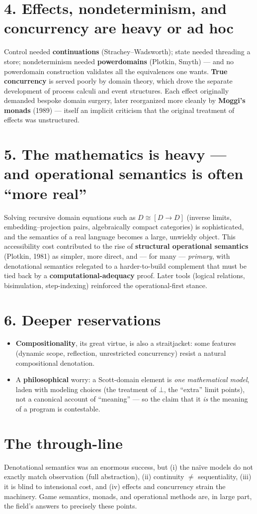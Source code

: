 \documentclass[11pt]{article}
\begin{document}
\section*{4. Effects, nondeterminism, and concurrency are heavy or ad hoc}
Control needed \textbf{continuations} (Strachey--Wadsworth); state needed
threading a store; nondeterminism needed \textbf{powerdomains} (Plotkin, Smyth)
--- and no powerdomain construction validates all the equivalences one wants.
\textbf{True concurrency} is served poorly by domain theory, which drove the
separate development of process calculi and event structures. Each effect
originally demanded bespoke domain surgery, later reorganized more cleanly by
\textbf{Moggi's monads} (1989) --- itself an implicit criticism that the original
treatment of effects was unstructured.

\section*{5. The mathematics is heavy --- and operational semantics is often ``more real''}
Solving recursive domain equations such as $D \cong [D \to D]$ (inverse limits,
embedding--projection pairs, algebraically compact categories) is sophisticated,
and the semantics of a real language becomes a large, unwieldy object. This
accessibility cost contributed to the rise of \textbf{structural operational
semantics} (Plotkin, 1981) as simpler, more direct, and --- for many ---
\emph{primary}, with denotational semantics relegated to a harder-to-build
complement that must be tied back by a \textbf{computational-adequacy} proof.
Later tools (logical relations, bisimulation, step-indexing) reinforced the
operational-first stance.

\section*{6. Deeper reservations}
\begin{itemize}
  \item \textbf{Compositionality}, its great virtue, is also a straitjacket: some
    features (dynamic scope, reflection, unrestricted concurrency) resist a
    natural compositional denotation.
  \item A \textbf{philosophical} worry: a Scott-domain element is \emph{one
    mathematical model}, laden with modeling choices (the treatment of $\bot$,
    the ``extra'' limit points), not a canonical account of ``meaning'' --- so
    the claim that it \emph{is} the meaning of a program is contestable.
\end{itemize}

\section*{The through-line}
Denotational semantics was an enormous success, but (i) the na\"ive models do not
exactly match observation (full abstraction), (ii) continuity $\neq$
sequentiality, (iii) it is blind to intensional cost, and (iv) effects and
concurrency strain the machinery. Game semantics, monads, and operational methods
are, in large part, the field's answers to precisely these points.
\end{document}
